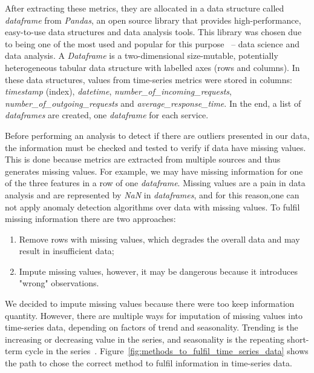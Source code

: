 After extracting these metrics, they are allocated in a data structure called \emph{dataframe} from \emph{Pandas}, an open source library that provides high-performance, easy-to-use data structures and data analysis tools. This library was chosen due to being one of the most used and popular for this purpose~\cite{pandas} -- data science and data analysis. A \emph{Dataframe} is a two-dimensional size-mutable, potentially heterogeneous tabular data structure with labelled axes (rows and columns).  In these data structures, values from time-series metrics were stored in columns: \emph{timestamp} (index), \emph{datetime}, \emph{number\_of\_incoming\_requests}, \emph{number\_of\_outgoing\_requests} and \emph{average\_response\_time}. In the end, a list of \emph{dataframes} are created, one \emph{dataframe} for each service.

Before performing an analysis to detect if there are outliers presented in our data, the information must be checked and tested to verify if data have missing values. This is done because metrics are extracted from multiple sources and thus generates missing values. For example, we may have missing information for one of the three features in a row of one \emph{dataframe}. Missing values are a pain in data analysis and are represented by \emph{NaN} in \emph{dataframes}, and for this reason,one can not apply anomaly detection algorithms over data with missing values. To fulfil missing information there are two approaches:

\begin{enumerate}
    \item Remove rows with missing values, which degrades the overall data and may result in insufficient data;
    \item Impute missing values, however, it may be dangerous because it introduces "wrong" observations.
\end{enumerate}

We decided to impute missing values because there were too keep information quantity. However, there are multiple ways for imputation of missing values into time-series data, depending on factors of trend and seasonality. Trending is the increasing or decreasing value in the series, and seasonality is the repeating short-term cycle in the series~\cite{Brillinger2006}. Figure~\ref{fig:methods_to_fulfil_time_series_data} shows the path to chose the correct method to fulfil information in time-series data.

